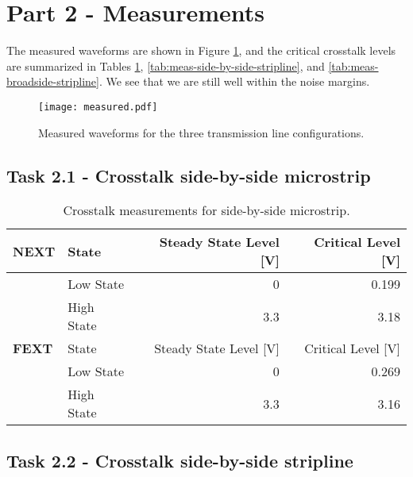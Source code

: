 \documentclass[../main.tex]{subfiles}
\begin{document}
\section{Part 2 - Measurements}

The measured waveforms are shown in Figure \ref{fig:meas-waveforms}, and the critical crosstalk levels are summarized in Tables \ref{tab:meas-side-by-side-microstrip}, \ref{tab:meas-side-by-side-stripline}, and \ref{tab:meas-broadside-stripline}. We see that we are still well within the noise margins.

\begin{figure}[h]
    \centering
    \texttt{[image: measured.pdf]}
    \caption{Measured waveforms for the three transmission line configurations.}
    \label{fig:meas-waveforms}
\end{figure}

\subsection{Task 2.1 - Crosstalk side-by-side microstrip}

\begin{table}[h]
    \centering
    \begin{tabular}{l l|r r}
        \toprule[1pt]
        \textbf{NEXT} & State & Steady State Level [V] & Critical Level [V] \\
        \midrule
        & Low State & 0 & 0.199 \\
        & High State & 3.3 & 3.18 \\
        \midrule[1pt]
        \textbf{FEXT} & State & Steady State Level [V] & Critical Level [V] \\
        \midrule
        & Low State & 0 & 0.269 \\
        & High State & 3.3 & 3.16 \\
        \bottomrule[1pt]
    \end{tabular}
    \caption{Crosstalk measurements for side-by-side microstrip.}
    \label{tab:meas-side-by-side-microstrip}
\end{table}

\subsection{Task 2.2 - Crosstalk side-by-side stripline}
\end{document}
